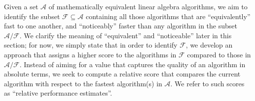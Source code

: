 \documentclass[conference]{IEEEtran}
\begin{document}
Given a set $\mathcal{A}$ of mathematically equivalent linear algebra algorithms, we aim to identify the subset
$\mathcal{F} \subseteq \mathcal{A}$ containing all those algorithms that are ``equivalently'' fast to one another, and
``noticeably'' faster than any algorithm in the subset $\mathcal{A}/\mathcal{F}$. We clarify the meaning of ``equivalent'' and
``noticeable'' later in this section; for now, we simply state that in order to identify $\mathcal{F}$, 
we develop an approach that assigns a higher score to the algorithms in
$\mathcal{F}$ compared to those in $\mathcal{A}/\mathcal{F}$. Instead of aiming for a value that captures the quality of an algorithm in absolute terms, we seek to compute a relative score that compares the current algorithm with respect to the fastest algorithm(s) in $\mathcal{A}$. We refer to such scores as ``relative performance estimates''.
\end{document}
